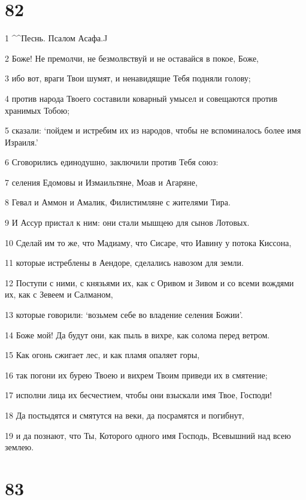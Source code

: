 \chapter{82}

\par 1 ^^Песнь. Псалом Асафа.^^
\par 2 Боже! Не премолчи, не безмолвствуй и не оставайся в покое, Боже,
\par 3 ибо вот, враги Твои шумят, и ненавидящие Тебя подняли голову;
\par 4 против народа Твоего составили коварный умысел и совещаются против хранимых Тобою;
\par 5 сказали: `пойдем и истребим их из народов, чтобы не вспоминалось более имя Израиля.'
\par 6 Сговорились единодушно, заключили против Тебя союз:
\par 7 селения Едомовы и Измаильтяне, Моав и Агаряне,
\par 8 Гевал и Аммон и Амалик, Филистимляне с жителями Тира.
\par 9 И Ассур пристал к ним: они стали мышцею для сынов Лотовых.
\par 10 Сделай им то же, что Мадиаму, что Сисаре, что Иавину у потока Киссона,
\par 11 которые истреблены в Аендоре, сделались навозом для земли.
\par 12 Поступи с ними, с князьями их, как с Оривом и Зивом и со всеми вождями их, как с Зевеем и Салманом,
\par 13 которые говорили: `возьмем себе во владение селения Божии'.
\par 14 Боже мой! Да будут они, как пыль в вихре, как солома перед ветром.
\par 15 Как огонь сжигает лес, и как пламя опаляет горы,
\par 16 так погони их бурею Твоею и вихрем Твоим приведи их в смятение;
\par 17 исполни лица их бесчестием, чтобы они взыскали имя Твое, Господи!
\par 18 Да постыдятся и смятутся на веки, да посрамятся и погибнут,
\par 19 и да познают, что Ты, Которого одного имя Господь, Всевышний над всею землею.

\chapter{83}

